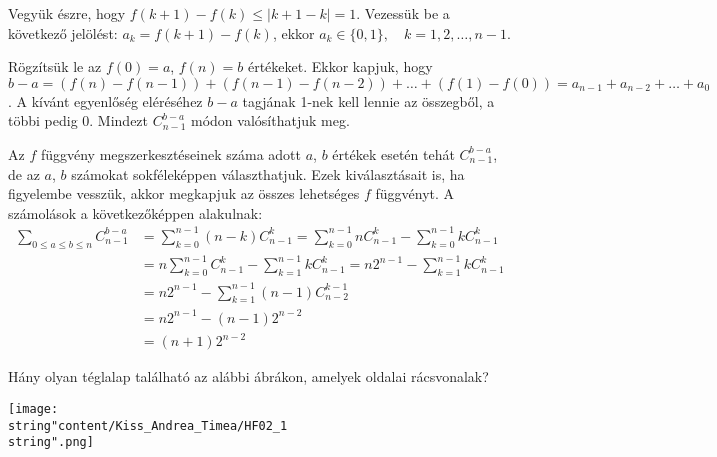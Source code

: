 \begin{solution}
Vegyük észre, hogy $f(k+1)-f(k)\leq|k+1-k|=1$. Vezessük be a következő
jelölést: $a_{k}=f(k+1)-f(k)$, ekkor $a_{k}\in\{0,1\},\quad k=1,2,\dots,n-1$.

Rögzítsük le az $f(0)=a$, $f(n)=b$ értékeket. Ekkor kapjuk, hogy\\
 $b-a=(f(n)-f(n-1))+(f(n-1)-f(n-2))+\dots+(f(1)-f(0))=a_{n-1}+a_{n-2}+\dots+a_{0}$.
A kívánt egyenlőség eléréséhez $b-a$ tagjának 1-nek kell lennie az
összegből, a többi pedig 0. Mindezt $C_{n-1}^{b-a}$ módon valósíthatjuk
meg.

Az $f$ függvény megszerkesztéseinek száma adott $a$, $b$ értékek
esetén tehát $C_{n-1}^{b-a}$, de az $a$, $b$ számokat sokféleképpen
választhatjuk. Ezek kiválasztásait is, ha figyelembe vesszük, akkor
megkapjuk az összes lehetséges $f$ függvényt. A számolások a következőképpen
alakulnak: 
\begin{align*}
\sum_{0\leq a\leq b\leq n}C_{n-1}^{b-a} & =\sum_{k=0}^{n-1}(n-k)C_{n-1}^{k}=\sum_{k=0}^{n-1}nC_{n-1}^{k}-\sum_{k=0}^{n-1}kC_{n-1}^{k}\\
 & =n\sum_{k=0}^{n-1}C_{n-1}^{k}-\sum_{k=1}^{n-1}kC_{n-1}^{k}=n2^{n-1}-\sum_{k=1}^{n-1}kC_{n-1}^{k}\\
 & =n2^{n-1}-\sum_{k=1}^{n-1}(n-1)C_{n-2}^{k-1}\\
 & =n2^{n-1}-(n-1)2^{n-2}\\
 & =(n+1)2^{n-2}
\end{align*}
\end{solution}

\begin{extraproblem}
Hány olyan téglalap található az alábbi ábrákon, amelyek oldalai
rácsvonalak? 
\begin{center}
\texttt{[image: \\string"content/Kiss\_Andrea\_Timea/HF02\_1\\string".png]} 
\par\end{center}
\end{extraproblem}

